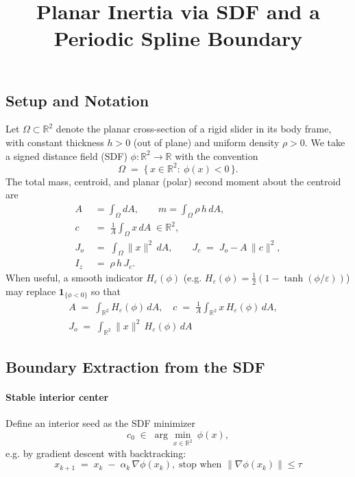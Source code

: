 \documentclass[conference]{IEEEtran}
\begin{document}
\title{Planar Inertia via SDF and a Periodic Spline Boundary}
\maketitle
\IEEEpeerreviewmaketitle

\subsection{Setup and Notation}
\noindent Let $\Omega\subset\mathbb{R}^2$ denote the planar cross-section of a rigid slider in its body frame, with constant thickness $h>0$ (out of plane) and uniform density $\rho>0$. We take a signed distance field (SDF) $\phi:\mathbb{R}^2\!\to\mathbb{R}$ with the convention
\[
\Omega \;=\; \{\,x\in\mathbb{R}^2:\ \phi(x)<0\,\}.
\]
The total mass, centroid, and planar (polar) second moment about the centroid are
\begin{align}
A &= \int_{\Omega} dA, \qquad
m =\int_{\Omega}\rho\,h\,dA,\\
c \;&=\; \frac{1}{A}\int_{\Omega} x\,dA \;\in\mathbb{R}^2,\\
J_o \;&=\; \int_{\Omega} \|x\|^2\,dA, \qquad
J_c \;=\; J_o - A\,\|c\|^2,\\
I_z \;&=\; \rho\,h\,J_c.
\end{align}
When useful, a smooth indicator $H_\varepsilon(\phi)$ (e.g. $H_\varepsilon(\phi)=\tfrac12(1-\tanh(\phi/\varepsilon))$) may replace $\mathbf{1}_{\{\phi<0\}}$ so that
\begin{align}
A \;=\; \int_{\mathbb{R}^2} H_\varepsilon(\phi)\,dA,\quad
c \;=\; \frac{1}{A}\int_{\mathbb{R}^2} x\,H_\varepsilon(\phi)\,dA,\quad \\
J_o \;=\; \int_{\mathbb{R}^2} \|x\|^2\,H_\varepsilon(\phi)\,dA
\end{align}

\subsection{Boundary Extraction from the SDF}
\paragraph{Stable interior center}
Define an interior seed as the SDF minimizer
\begin{equation}
c_0 \;\in\; \arg\min_{x\in\mathbb{R}^2}\ \phi(x),
\end{equation}
e.g. by gradient descent with backtracking:
\begin{equation}
x_{k+1} \;=\; x_k \;-\; \alpha_k\,\nabla\phi(x_k),
\; \text{stop when } \|\nabla\phi(x_k)\| \le \tau
\end{equation}
\end{document}
